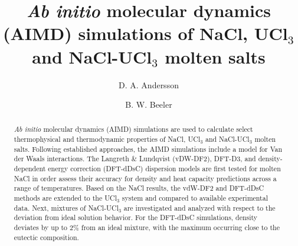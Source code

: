 \documentclass[preprint,3p,10pt,onecolumn,number,sort&compress]{elsarticle}
\begin{document}
\begin{frontmatter}

\title{\textit{Ab initio} molecular dynamics (AIMD) simulations of NaCl, UCl$_3$ and NaCl-UCl$_3$ molten salts}

\author[label1]{D. A. Andersson}
\author[label2,label3]{B. W. Beeler}
\address[label1]{Los Alamos National Laboratory}
\address[label2]{North Carolina State University}
\address[label3]{Idaho National Laboratory}


\begin{abstract}
\textit{Ab initio} molecular dynamics (AIMD) simulations are used to calculate select thermophysical %
and thermodynamic %
properties of NaCl, UCl$_3$ and NaCl-UCl$_3$ molten salts. Following established approaches, the AIMD simulations %
include a model for Van der Waals interactions. The Langreth \& Lundqvist (vDW-DF2), DFT-D3, and density-dependent energy correction (DFT-dDsC) dispersion models are first tested for molten NaCl in order assess their accuracy for density and heat capacity predictions across a range of temperatures. %
Based on the NaCl results, the vdW-DF2 and DFT-dDsC methods are extended to the UCl$_3$ system and compared to available experimental data. %
Next, mixtures of NaCl-UCl$_3$ are investigated and analyzed with respect to the deviation from ideal solution behavior. %
For the DFT-dDsC simulations, density deviates by up to 2\% from an ideal mixture, with the maximum occurring close to the eutectic composition. %

\end{abstract}
\end{frontmatter}
\end{document}
